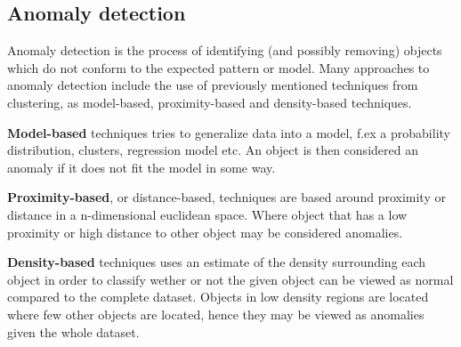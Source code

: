 \subsection{Anomaly detection}
	Anomaly detection is the process of identifying (and possibly removing) objects which do not conform to the expected pattern or model. 
	Many approaches to anomaly detection include the use of 
	previously mentioned techniques from clustering, as model-based, proximity-based and density-based techniques. 
	
	\bigskip\noindent
	\textbf{Model-based} techniques tries to generalize data into a model, 
	f.ex a probability distribution, clusters, regression model etc. 
	An object is then considered an anomaly if it does not fit the model in some way. 
	
	\bigskip\noindent
	\textbf{Proximity-based}, or distance-based, techniques are based around proximity or distance in a n-dimensional euclidean space. 
	Where object that has a low proximity or high distance to other object may be considered anomalies.
	
	\bigskip\noindent
	\textbf{Density-based} techniques uses an estimate of the density surrounding each object in order to classify wether or not the given object can be viewed as normal compared to the complete dataset. Objects in low density regions are located where few other objects are located, hence they may be viewed as anomalies given the whole dataset.
	
